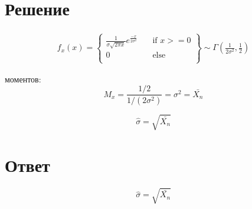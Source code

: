 \section*{Решение} 

\begin{gather*} 
\left.f_x(x) =
  \begin{cases}
    \frac{1}{\sigma\sqrt{2\pi x}}e^{\frac{-x}{2\sigma^2}}       & \quad \text{if } x >= 0\\
   	0  & \quad \text{else }\\
  \end{cases}
\right\}
\sim
\Gamma( \frac{1}{2\sigma^2},  \frac{1}{2} )
\end{gather*} 		

 моментов:
\begin{equation*} 
M_x = \frac{1/2}{1/(2\sigma^2)} = \sigma^2 = \bar{X_n}
\end{equation*}

\begin{equation*} 
	\widehat{\sigma} = \sqrt{\bar{X_n}}
\end{equation*}

\section*{Ответ} 
\begin{equation*} 
	\widehat{\sigma} = \sqrt{\bar{X_n}}
\end{equation*}


